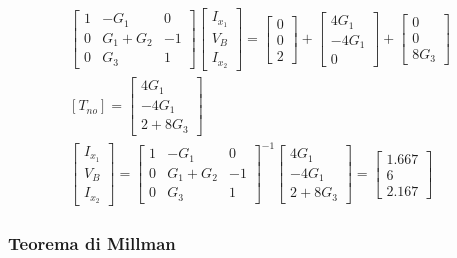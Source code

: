 \documentclass{article}
\numberwithin{equation}{subsection}
\begin{document}
\begin{gather*}
    \begin{bmatrix}
        1&-G_1&0\\0&G_1+G_2&-1\\0&G_3&1
    \end{bmatrix}\begin{bmatrix}
        I_{x_1}\\V_B\\I_{x_2}
    \end{bmatrix}=\begin{bmatrix}
        0\\0\\2
    \end{bmatrix}+\begin{bmatrix}
        4G_1\\-4G_1\\0
    \end{bmatrix}+\begin{bmatrix}
        0\\0\\8G_3
    \end{bmatrix}\\
    [T_{no}]=\begin{bmatrix}
        4G_1\\-4G_1\\2+8G_3
    \end{bmatrix}\\
    \begin{bmatrix}
        I_{x_1}\\V_B\\I_{x_2}
    \end{bmatrix}=\begin{bmatrix}
        1&-G_1&0\\0&G_1+G_2&-1\\0&G_3&1
    \end{bmatrix}^{-1}\begin{bmatrix}
        4G_1\\-4G_1\\2+8G_3
    \end{bmatrix}=\begin{bmatrix}
        1.667\\
        6\\
        2.167
    \end{bmatrix}
\end{gather*}

\subsubsection{Teorema di Millman}
\end{document}
